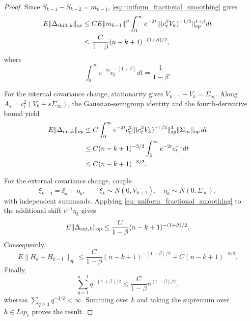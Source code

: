 \documentclass[10pt,a4paper]{article}
\begin{document}
\begin{proof}
Since $S_{k-1}-S_{k-2}=m_{k-1}$, \eqref{eq: uniform_fractional_smoothing}
gives
\begin{align*}
E\|\Delta_{{\rm shift},k}\|_{op}
&\le C E\|m_{k-1}\|^\beta
\int_0^\infty e^{-2t}\|(c_t^2V_k)^{-1/2}\|_{op}^{1+\beta}dt\\
&\le \frac{C}{1-\beta}(n-k+1)^{-(1+\beta)/2},
\end{align*}
where
\[
    \int_0^\infty e^{-2t}c_t^{-(1+\beta)}dt=\frac1{1-\beta}.
\]

For the internal covariance change, stationarity gives
$V_{k-1}-V_k=\Sigma_\infty$. Along
$A_s=c_t^2(V_k+s\Sigma_\infty)$, the Gaussian-semigroup identity and the
fourth-derivative bound yield
\begin{align*}
E\|\Delta_{{\rm int},k}\|_{op}
&\le C\int_0^\infty e^{-2t}c_t^2
\|(c_t^2V_k)^{-1/2}\|_{op}^3\|\Sigma_\infty\|_{op}\,dt\\
&\le C(n-k+1)^{-3/2}\int_0^\infty e^{-2t}c_t^{-1}dt\\
&\le C(n-k+1)^{-3/2}.
\end{align*}

For the external covariance change, couple
\[
\xi_{k-1}=\xi_k+\eta_k,\qquad
\xi_k\sim N(0,V_{k+1}),\quad
\eta_k\sim N(0,\Sigma_\infty),
\]
with independent summands. Applying
\eqref{eq: uniform_fractional_smoothing} to the additional shift
$e^{-t}\eta_k$ gives
\[
E\|\Delta_{{\rm ext},k}\|_{op}
\le \frac{C}{1-\beta}(n-k+1)^{-(1+\beta)/2}.
\]
Consequently,
\[
E\|H_k-H_{k-1}\|_{op}
\le \frac{C}{1-\beta}(n-k+1)^{-(1+\beta)/2}
+C(n-k+1)^{-3/2}.
\]
Finally,
\[
\sum_{q=1}^{n-1}q^{-(1+\beta)/2}
\le \frac{C}{1-\beta}n^{(1-\beta)/2},
\]
whereas $\sum_{q\ge1}q^{-3/2}<\infty$. Summing over $k$ and taking the
supremum over $h\in Lip_1$ proves the result.
\end{proof}
\end{document}
